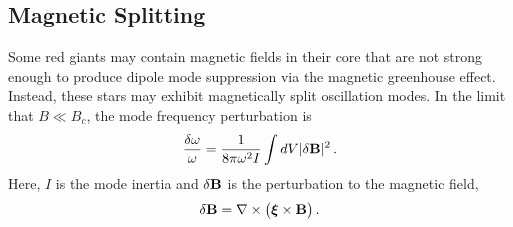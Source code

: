 \subsection{Magnetic Splitting}

Some red giants may contain magnetic fields in their core that are not strong enough to produce dipole mode suppression via the magnetic greenhouse effect. Instead, these stars may exhibit magnetically split oscillation modes. In the limit that $B \ll B_c$, the mode frequency perturbation is \citep{Unno_1989}
\begin{equation}
\label{eqn:dommag}
\frac{\delta \omega}{\omega} = \frac{1}{8 \pi \omega^2 I} \int d V | \delta {\bf B} |^2 \, .
\end{equation}
Here, $I$ is the mode inertia and  $\delta {\bf B}$ is the perturbation to the magnetic field,
\begin{equation}
\label{eqn:dB}
\delta {\bf B} = {\bf \nabla} \times \big( {\rm{\mbox{\boldmath $\xi$}}} \times {\bf B} \big) \, .
\end{equation}